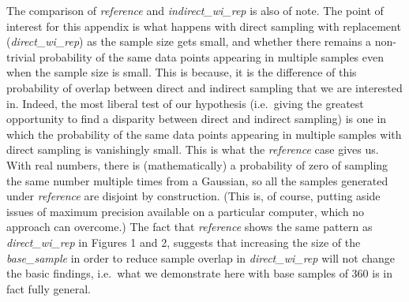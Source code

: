 \documentclass[
]{article}
\begin{document}
The comparison of \emph{reference} and \emph{indirect\_wi\_rep} is also
of note. The point of interest for this appendix is what happens with
direct sampling with replacement (\emph{direct\_wi\_rep}) as the sample
size gets small, and whether there remains a non-trivial probability of
the same data points appearing in multiple samples even when the sample
size is small. This is because, it is the difference of this probability
of overlap between direct and indirect sampling that we are interested
in. Indeed, the most liberal test of our hypothesis (i.e.~giving the
greatest opportunity to find a disparity between direct and indirect
sampling) is one in which the probability of the same data points
appearing in multiple samples with direct sampling is vanishingly small.
This is what the \emph{reference} case gives us. With real numbers,
there is (mathematically) a probability of zero of sampling the same
number multiple times from a Gaussian, so all the samples generated
under \emph{reference} are disjoint by construction. (This is, of
course, putting aside issues of maximum precision available on a
particular computer, which no approach can overcome.) The fact that
\emph{reference} shows the same pattern as \emph{direct\_wi\_rep} in
Figures 1 and 2, suggests that increasing the size of the
\emph{base\_sample} in order to reduce sample overlap in
\emph{direct\_wi\_rep} will not change the basic findings, i.e.~what we
demonstrate here with base samples of 360 is in fact fully general.
\end{document}
